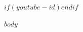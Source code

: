 \documentclass[a4paper,10.5pt]{article}
\begin{document}
\def\tightlist{}
\def\real#1{#1}

\setlength{\parskip}{0.6em}
\setlength{\parindent}{0pt}
\renewcommand{\baselinestretch}{1.4}

\pagestyle{fancy}
\fancyhf{}
\renewcommand{\headrulewidth}{0pt}

\titleformat{\section}{\sffamily\bfseries\large}{}{0em}{}
\titleformat{\subsection}{\sffamily\bfseries\normalsize}{}{0em}{}

$if(youtube-id)$$endif$

$body$
\end{document}

